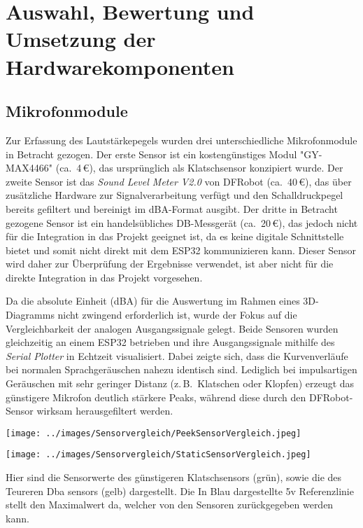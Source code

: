 \chapter{Auswahl, Bewertung und Umsetzung der Hardwarekomponenten}

\section{Mikrofonmodule}

Zur Erfassung des Lautstärkepegels wurden drei unterschiedliche Mikrofonmodule in Betracht gezogen. 
Der erste Sensor ist ein kostengünstiges Modul "GY-MAX4466" (ca.\ 4\,€), das ursprünglich als Klatschsensor konzipiert wurde. 
Der zweite Sensor ist das \textit{Sound Level Meter V2.0} von DFRobot (ca.\ 40\,€), das über zusätzliche Hardware zur Signalverarbeitung verfügt und den Schalldruckpegel bereits gefiltert und bereinigt im dBA-Format ausgibt.
Der dritte in Betracht gezogene Sensor ist ein handelsübliches DB-Messgerät (ca.\ 20\,€), das jedoch nicht für die Integration in das Projekt geeignet ist, da es keine digitale Schnittstelle bietet und somit nicht direkt mit dem ESP32 kommunizieren kann.
Dieser Sensor wird daher zur Überprüfung der Ergebnisse verwendet, ist aber nicht für die direkte Integration in das Projekt vorgesehen.

Da die absolute Einheit (dBA) für die Auswertung im Rahmen eines 3D-Diagramms nicht zwingend erforderlich ist, wurde der Fokus auf die Vergleichbarkeit der analogen Ausgangssignale gelegt. 
Beide Sensoren wurden gleichzeitig an einem ESP32 betrieben und ihre Ausgangssignale mithilfe des \textit{Serial Plotter} in Echtzeit visualisiert. 
Dabei zeigte sich, dass die Kurvenverläufe bei normalen Sprachgeräuschen nahezu identisch sind. 
Lediglich bei impulsartigen Geräuschen mit sehr geringer Distanz (z.\,B.\ Klatschen oder Klopfen) erzeugt das günstigere Mikrofon deutlich stärkere Peaks, während diese durch den DFRobot-Sensor wirksam herausgefiltert werden.

\begin{center}
  \texttt{[image: ../images/Sensorvergleich/PeekSensorVergleich.jpeg]}
\end{center}
\begin{center}
  \texttt{[image: ../images/Sensorvergleich/StaticSensorVergleich.jpeg]}
\end{center}

Hier sind die Sensorwerte des günstigeren Klatschsensors (grün), sowie die des Teureren Dba sensors (gelb) dargestellt. Die In Blau dargestellte 5v Referenzlinie stellt den Maximalwert da, welcher von den Sensoren zurückgegeben werden kann.

